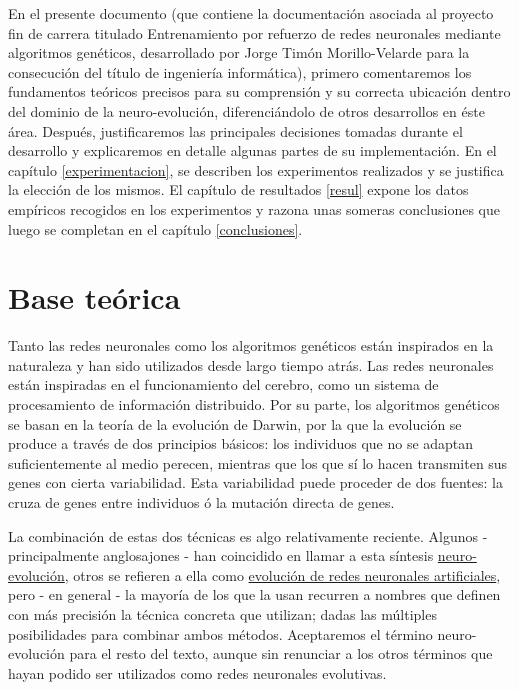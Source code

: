 \documentclass[a4paper,11pt]{article}
\begin{document}
 En el presente documento (que contiene la documentaci\'on asociada al proyecto fin de carrera titulado \flqq Entrenamiento por refuerzo de redes neuronales mediante algoritmos gen\'eticos\frqq, desarrollado por Jorge Tim\'on Morillo-Velarde para la consecuci\'on del t\'itulo de ingenier\'ia inform\'atica), primero comentaremos los fundamentos te\'oricos precisos para su comprensi\'on y su correcta ubicaci\'on dentro del dominio de la neuro-evoluci\'on, diferenci\'andolo de otros desarrollos en \'este \'area. Despu\'es, justificaremos las principales decisiones tomadas durante el desarrollo y explicaremos en detalle algunas partes de su implementaci\'on. En el cap\'itulo \ref{experimentacion}, se describen los experimentos realizados y se justifica la elecci\'on de los mismos. El cap\'itulo de resultados \ref{resul} expone los datos emp\'iricos recogidos en los experimentos y razona unas someras conclusiones que luego se completan en el cap\'itulo \ref{conclusiones}.


\section{Base te\'orica}\label{baseTeorica}


Tanto las redes neuronales como los algoritmos gen\'eticos est\'an inspirados en la naturaleza y han sido utilizados desde largo tiempo atr\'as. Las redes neuronales est\'an inspiradas en el funcionamiento del cerebro, como un sistema de procesamiento de informaci\'on distribuido. Por su parte, los algoritmos gen\'eticos se basan en la teor\'ia de la evoluci\'on de Darwin, por la que la evoluci\'on se produce a trav\'es de dos principios b\'asicos: los individuos que no se adaptan suficientemente al medio perecen, mientras que los que s\'i lo hacen transmiten sus genes con cierta variabilidad. Esta variabilidad puede proceder de dos fuentes: la cruza de genes entre individuos \'o la mutaci\'on directa de genes.

 La combinaci\'on de estas dos t\'ecnicas es algo relativamente reciente. Algunos - principalmente anglosajones - han coincidido en llamar a esta s\'intesis \href{http://en.wikipedia.org/wiki/Neuroevolution}{neuro-evoluci\'on}, otros se refieren a ella como \href{http://laral.istc.cnr.it/nolfi/papers/HBTNN-A.pdf}{evoluci\'on de redes neuronales artificiales}, pero - en general - la mayor\'ia de los que la usan recurren a nombres que definen con m\'as precisi\'on la t\'ecnica concreta que utilizan; dadas las m\'ultiples posibilidades para combinar ambos m\'etodos. Aceptaremos el t\'ermino neuro-evoluci\'on para el resto del texto, aunque sin renunciar a los otros t\'erminos que hayan podido ser utilizados como redes neuronales evolutivas.
\end{document}
